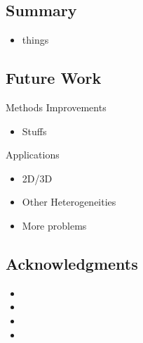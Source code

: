 \subsection{Summary}
\begin{frame}
    
    \begin{itemize}
        \item things
    \end{itemize}
    
\end{frame}


\subsection{Future Work}
\begin{frame}[t]{Methods Improvements}
    
    \begin{itemize}
        \item Stuffs
    \end{itemize}
    
\end{frame}


\begin{frame}[t]{Applications}
    
    \begin{itemize}
        \item 2D/3D
        \item Other Heterogeneities
        \item More problems
    \end{itemize}

\end{frame}


\subsection{Acknowledgments}
\begin{frame}

\footnotesize
\begin{itemize}
    \item 
    \item 
    \item 
    \item 
\end{itemize}

\end{frame}


